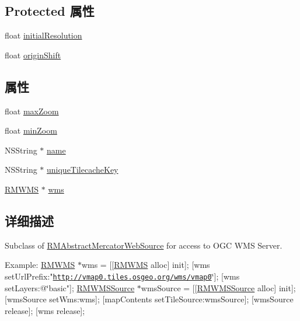 \subsection*{Protected 属性}
\begin{DoxyCompactItemize}
\item 
float \hyperlink{interface_r_m_w_m_s_source_a7c898e765ab5025ef2e17fcc3617027f}{initial\-Resolution}
\item 
float \hyperlink{interface_r_m_w_m_s_source_a9d22e05ba369ca54c36df2f244b2ecfb}{origin\-Shift}
\end{DoxyCompactItemize}
\subsection*{属性}
\begin{DoxyCompactItemize}
\item 
float \hyperlink{interface_r_m_w_m_s_source_a1d2e9448d275d7fafafa95b287862fb9}{max\-Zoom}
\item 
float \hyperlink{interface_r_m_w_m_s_source_aa0708e3fd3f7490c0858b0ea489f7a70}{min\-Zoom}
\item 
N\-S\-String $\ast$ \hyperlink{interface_r_m_w_m_s_source_a052261f302f1286e519c85f1d35141b1}{name}
\item 
N\-S\-String $\ast$ \hyperlink{interface_r_m_w_m_s_source_a22ec28f953a31a412f001cabeb511a6e}{unique\-Tilecache\-Key}
\item 
\hyperlink{interface_r_m_w_m_s}{R\-M\-W\-M\-S} $\ast$ \hyperlink{interface_r_m_w_m_s_source_a582f903e7f1723155103ef497decc6e9}{wms}
\end{DoxyCompactItemize}


\subsection{详细描述}
Subclass of \hyperlink{interface_r_m_abstract_mercator_web_source}{R\-M\-Abstract\-Mercator\-Web\-Source} for access to O\-G\-C W\-M\-S Server. 

Example\-: \hyperlink{interface_r_m_w_m_s}{R\-M\-W\-M\-S} $\ast$wms = \mbox{[}\mbox{[}\hyperlink{interface_r_m_w_m_s}{R\-M\-W\-M\-S} alloc\mbox{]} init\mbox{]}; \mbox{[}wms set\-Url\-Prefix\-:"\href{http://vmap0.tiles.osgeo.org/wms/vmap0}{\tt http\-://vmap0.\-tiles.\-osgeo.\-org/wms/vmap0}\char`\"{}\mbox{]};
\mbox{[}wms set\-Layers\-:@\char`\"{}basic"\mbox{]}; \hyperlink{interface_r_m_w_m_s_source}{R\-M\-W\-M\-S\-Source} $\ast$wms\-Source = \mbox{[}\mbox{[}\hyperlink{interface_r_m_w_m_s_source}{R\-M\-W\-M\-S\-Source} alloc\mbox{]} init\mbox{]}; \mbox{[}wms\-Source set\-Wms\-:wms\mbox{]}; \mbox{[}map\-Contents set\-Tile\-Source\-:wms\-Source\mbox{]}; \mbox{[}wms\-Source release\mbox{]}; \mbox{[}wms release\mbox{]}; 

